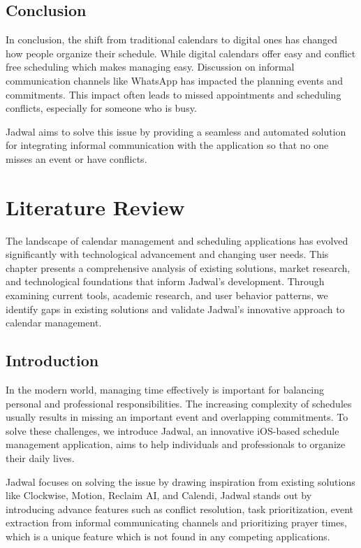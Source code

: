 \documentclass[12pt,a4paper]{report}
\begin{document}
\section{Conclusion}

In conclusion, the shift from traditional calendars to digital ones has changed how people organize their schedule.
While digital calendars offer easy and conflict free scheduling which makes managing easy.
Discussion on informal communication channels like WhatsApp has impacted the planning events and commitments.
This impact often leads to missed appointments and scheduling conflicts, especially for someone who is busy.

Jadwal aims to solve this issue by providing a seamless and automated solution for integrating informal communication with the application so that no one misses an event or have conflicts.

\chapter{Literature Review}

The landscape of calendar management and scheduling applications has evolved significantly with technological advancement and changing user needs. This chapter presents a comprehensive analysis of existing solutions, market research, and technological foundations that inform Jadwal's development. Through examining current tools, academic research, and user behavior patterns, we identify gaps in existing solutions and validate Jadwal's innovative approach to calendar management.

\section{Introduction}

In the modern world, managing time effectively is important for balancing personal and professional responsibilities.
The increasing complexity of schedules usually results in missing an important event and overlapping commitments.
To solve these challenges, we introduce Jadwal, an innovative iOS-based schedule management application, aims to help individuals and professionals to organize their daily lives.

Jadwal focuses on solving the issue by drawing inspiration from existing solutions like Clockwise, Motion, Reclaim AI, and Calendi, Jadwal stands out by introducing advance features such as conflict resolution, task prioritization, event extraction from informal communicating channels and prioritizing prayer times, which is a unique feature which is not found in any competing applications.
\end{document}
